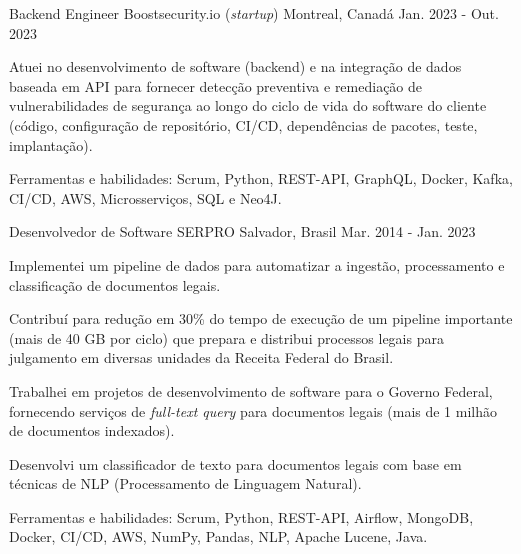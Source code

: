 


\begin{cventries}


\cventry
{Backend Engineer} %
{Boostsecurity.io (\textit{startup})} %
{Montreal, Canadá} %
{Jan. 2023 - Out. 2023} %
{ %
\begin{cvitems}
	\item {Atuei no desenvolvimento de software (backend) e na integração de dados baseada em API para fornecer detecção preventiva e remediação de vulnerabilidades de segurança ao longo do ciclo de vida do software do cliente (código, configuração de repositório, CI/CD, dependências de pacotes, teste, implantação).}
	\item{Ferramentas e habilidades: Scrum, Python, REST-API, GraphQL, Docker, Kafka, CI/CD, AWS, Microsserviços, SQL e Neo4J.}
\end{cvitems}
}


\cventry
{Desenvolvedor de Software} %
{SERPRO} %
{Salvador, Brasil} %
{Mar. 2014 - Jan. 2023} %
{ %
\begin{cvitems}
	\item{Implementei um pipeline de dados para automatizar a ingestão, processamento e classificação de documentos legais.}
	\item{Contribuí para redução em 30\% do tempo de execução de um pipeline importante (mais de 40 GB por ciclo) que prepara e distribui processos legais para julgamento em diversas unidades da Receita Federal do Brasil.}
	\item{Trabalhei em projetos de desenvolvimento de software para o Governo Federal, fornecendo serviços de \textit{full-text query} para documentos legais (mais de 1 milhão de documentos indexados).}
	\item{Desenvolvi um classificador de texto para documentos legais com base em técnicas de NLP (Processamento de Linguagem Natural).}
	\item{Ferramentas e habilidades: Scrum, Python, REST-API, Airflow, MongoDB, Docker, CI/CD, AWS, NumPy, Pandas, NLP, Apache Lucene, Java.}
\end{cvitems}
}


\end{cventries}
